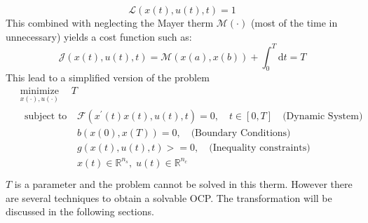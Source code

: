 %
\begin{equation}
    \mathcal{L}(x(t), u(t), t) = 1
\end{equation}
%
This combined with neglecting the Mayer therm $\mathcal{M}(\cdot)$ (most of the time in unnecessary) yields a cost function such as:
%
\begin{equation}
    \mathcal{J}(x(t), u(t), t) = \mathcal{M}(x(a), x(b))+\int_{0}^{T}  \mathrm{d} t = T 
\end{equation}
%
This lead to a simplified version of the problem
%
\begin{equation}
    \begin{aligned}
    &\underset{x(\cdot), u(\cdot)}{\operatorname{minimize}} \quad T \\
    &\begin{aligned}
        {\text { subject to }} \;
        & \mathcal{F}(x^{\prime}(t)x(t),u(t),t)=0, \quad t \in[0, T] \quad \text{(Dynamic System)}\\
        & b(x(0),x(T))=0, \quad \text{(Boundary Conditions)}\\
        & g(x(t),u(t),t)>=0, \quad \text{(Inequality constraints)}\\
        & x(t) \in \mathbb{R}^{n_s}, \; u(t) \in \mathbb{R}^{n_c}
    \end{aligned}\\
    \end{aligned}
    \label{eq:OCPminT}
\end{equation}
%
$T$ is a parameter and the problem cannot be solved in this therm. However there are several techniques to obtain a solvable OCP. The transformation will be discussed in the following sections.
%